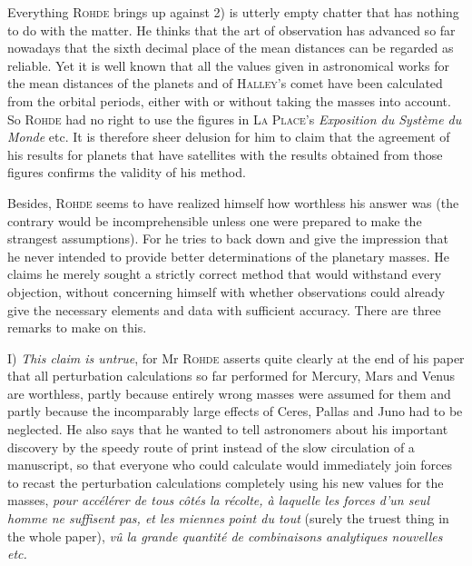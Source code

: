 Everything \textsc{Rohde} brings up against 2) is utterly empty chatter that has nothing to do with the matter. He thinks that the art of observation has advanced so far nowadays that the sixth decimal place of the mean distances can be regarded as reliable. Yet it is well known that all the values given in astronomical works for the mean distances of the planets and of \textsc{Halley}’s comet have been calculated from the orbital periods, either with or without taking the masses into account. So \textsc{Rohde} had no right to use the figures in \textsc{La Place}’s \emph{Exposition du Système du Monde} etc. It is therefore sheer delusion for him to claim that the agreement of his results for planets that have satellites with the results obtained from those figures confirms the validity of his method.

Besides, \textsc{Rohde} seems to have realized himself how worthless his answer was (the contrary would be incomprehensible unless one were prepared to make the strangest assumptions). For he tries to back down and give the impression that he never intended to provide better determinations of the planetary masses. He claims he merely sought a strictly correct method that would withstand every objection, without concerning himself with whether observations could already give the necessary elements and data with sufficient accuracy. There are three remarks to make on this.

\noindent I) \emph{This claim is untrue}, for Mr \textsc{Rohde} asserts quite clearly at the end of his paper that all perturbation calculations so far performed for Mercury, Mars and Venus are worthless, partly because entirely wrong masses were assumed for them and partly because the incomparably large effects of Ceres, Pallas and Juno had to be neglected. He also says that he wanted to tell astronomers about his important discovery by the speedy route of print instead of the slow circulation of a manuscript, so that everyone who could calculate would immediately join forces to recast the perturbation calculations completely using his new values for the masses, \emph{pour accélérer de tous côtés la récolte, à laquelle les forces d'un seul homme ne suffisent pas, et les miennes point du tout} (surely the truest thing in the whole paper), \emph{vû la grande quantité de combinaisons analytiques nouvelles etc.}

